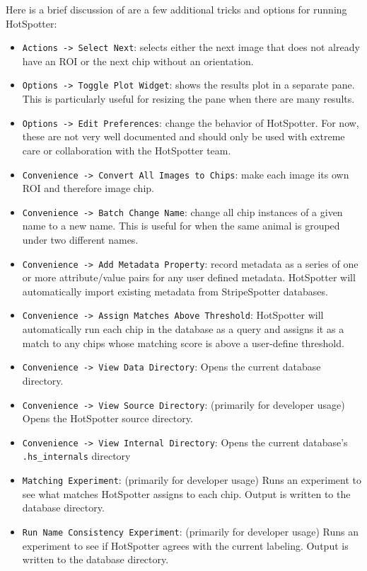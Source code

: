 \documentclass[a4paper,10pt]{article}
\begin{document}
Here is a brief discussion of are a few additional tricks and options
for running HotSpotter:
\begin{itemize}
\item \verb+Actions -> Select Next+:
    selects either the next image that does not already have an ROI or the next chip without an
    orientation. 

\item \verb+Options -> Toggle Plot Widget+: 
    shows the results plot in a separate pane.  This is particularly useful for
    resizing the pane when there are many results.

\item \verb+Options -> Edit Preferences+: 
    change the behavior of HotSpotter. For now, these are not very well
    documented and should only be used with extreme care or collaboration with
    the HotSpotter team.

\item \verb+Convenience -> Convert All Images to Chips+: 
    make each image its own ROI and therefore image chip.

\item \verb+Convenience -> Batch Change Name+:  
    change all chip instances of a given name to a new name. This is useful for
    when the same animal is grouped under two different names.

\item \verb+Convenience -> Add Metadata Property+:  
    record metadata as a series of one or more attribute/value pairs for any
    user defined metadata.  HotSpotter will automatically import existing
    metadata from StripeSpotter databases.

\item \verb+Convenience -> Assign Matches Above Threshold+: 
    HotSpotter will automatically run each chip in the database as a query and
    assigns it as a match to any chips whose matching score is above a
    user-define threshold. 

\item \verb+Convenience -> View Data Directory+: 
    Opens the current database directory.

\item \verb+Convenience -> View Source Directory+: (primarily for developer usage)
    Opens the HotSpotter source directory. 

\item \verb+Convenience -> View Internal Directory+: 
    Opens the current database's {\tt .hs\_internals} directory

\item \verb+Matching Experiment+: (primarily for developer usage)
    Runs an experiment to see what matches HotSpotter assigns to each chip.
    Output is written to the database directory. 

\item \verb+Run Name Consistency Experiment+: (primarily for developer usage) 
    Runs an experiment to see if HotSpotter agrees with the current labeling.
    Output is written to the database directory. 

\end{itemize}
  
\end{document}
